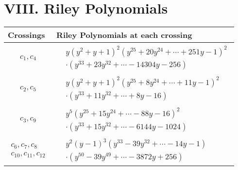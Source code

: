 \documentclass[1p]{elsarticle_modified}
\theoremstyle{definition}
\begin{document}
\centering \section*{ VIII. Riley Polynomials}
\begin{tabular}{m{50pt}|m{274pt}}
Crossings & \hspace{64pt}Riley Polynomials at each crossing \\
\hline $$\begin{aligned}c_{1},c_{4}\end{aligned}$$&$\begin{aligned}
&y(y^2+y+1)^2(y^{25}+20 y^{24}+\cdots+251 y-1)^{2}\\
&\cdot(y^{33}+23 y^{32}+\cdots-14304 y-256)
\end{aligned}$\\
\hline $$\begin{aligned}c_{2},c_{5}\end{aligned}$$&$\begin{aligned}
&y(y^2+y+1)^2(y^{25}+8 y^{24}+\cdots+11 y-1)^{2}\\
&\cdot(y^{33}+11 y^{32}+\cdots+8 y-16)
\end{aligned}$\\
\hline $$\begin{aligned}c_{3},c_{9}\end{aligned}$$&$\begin{aligned}
&y^5(y^{25}+15 y^{24}+\cdots-88 y-16)^{2}\\
&\cdot(y^{33}+15 y^{32}+\cdots-6144 y-1024)
\end{aligned}$\\
\hline $$\begin{aligned}c_{6},c_{7},c_{8}\\c_{10},c_{11},c_{12}\end{aligned}$$&$\begin{aligned}
&y^2(y-1)^3(y^{33}-39 y^{32}+\cdots-14 y-1)\\
&\cdot(y^{50}-39 y^{49}+\cdots-3872 y+256)
\end{aligned}$\\
\hline
\end{tabular}
\vskip 2pc
\end{document}
